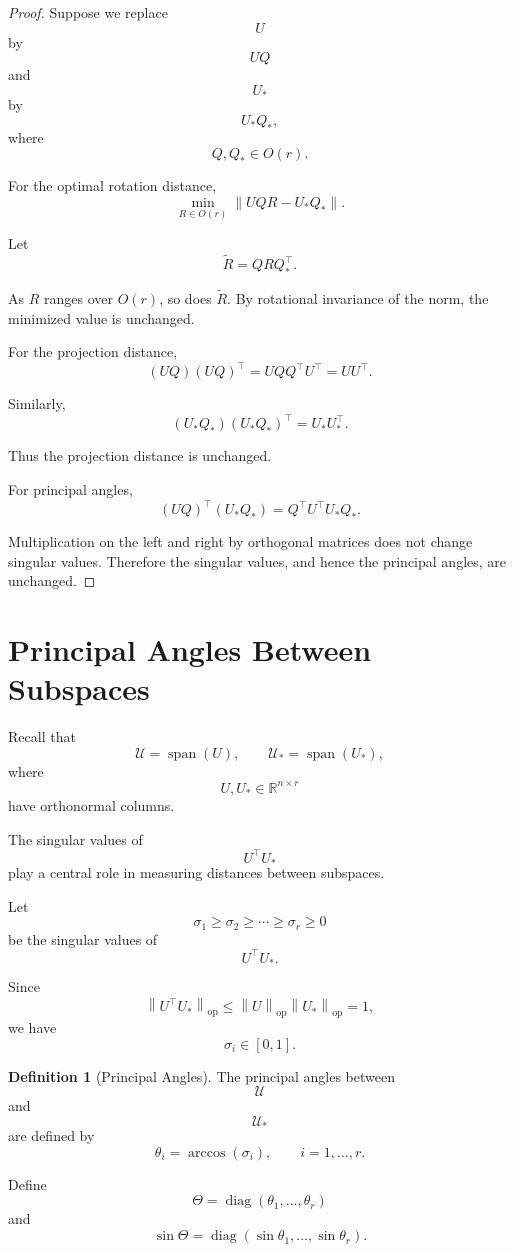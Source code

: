 \documentclass[12pt,oneside]{book}
\numberwithin{equation}{section}
\theoremstyle{definition}
\newtheorem{definition}{Definition}[section]
\theoremstyle{plain}
\theoremstyle{remark}
\newcommand{\R}{\mathbb{R}}
\newcommand{\norm}[1]{\left\lVert #1 \right\rVert}
\newcommand{\diag}{\operatorname{diag}}
\begin{document}
\begin{proof}
Suppose we replace
\[
U
\]
by
\[
UQ
\]
and
\[
U_*
\]
by
\[
U_*Q_*,
\]
where
\[
Q,Q_*\in O(r).
\]

For the optimal rotation distance,
\[
\min_{R\in O(r)}
\norm{UQR-U_*Q_*}.
\]

Let
\[
\widetilde{R}=QRQ_*^\top.
\]

As $R$ ranges over $O(r)$, so does $\widetilde{R}$. By rotational invariance of the norm, the minimized value is unchanged.

For the projection distance,
\[
(UQ)(UQ)^\top
=
UQQ^\top U^\top
=
UU^\top.
\]

Similarly,
\[
(U_*Q_*)(U_*Q_*)^\top
=
U_*U_*^\top.
\]

Thus the projection distance is unchanged.

For principal angles,
\[
(UQ)^\top(U_*Q_*)
=
Q^\top U^\top U_* Q_*.
\]

Multiplication on the left and right by orthogonal matrices does not change singular values. Therefore the singular values, and hence the principal angles, are unchanged.
\end{proof}

\section{Principal Angles Between Subspaces}

Recall that
\[
\mathcal{U}=\operatorname{span}(U),
\qquad
\mathcal{U}_*=\operatorname{span}(U_*),
\]
where
\[
U,U_*\in\R^{n\times r}
\]
have orthonormal columns.

The singular values of
\[
U^\top U_*
\]
play a central role in measuring distances between subspaces.

Let
\[
\sigma_1\geq \sigma_2\geq \cdots \geq \sigma_r\geq 0
\]
be the singular values of
\[
U^\top U_*.
\]

Since
\[
\norm{U^\top U_*}_{\mathrm{op}}
\leq
\norm{U}_{\mathrm{op}}
\norm{U_*}_{\mathrm{op}}
=
1,
\]
we have
\[
\sigma_i\in[0,1].
\]

\begin{definition}[Principal Angles]
The principal angles between
\[
\mathcal{U}
\]
and
\[
\mathcal{U}_*
\]
are defined by
\[
\theta_i
=
\arccos(\sigma_i),
\qquad
i=1,\dots,r.
\]
\end{definition}

Define
\[
\Theta
=
\diag(\theta_1,\dots,\theta_r)
\]
and
\[
\sin\Theta
=
\diag(\sin\theta_1,\dots,\sin\theta_r).
\]
\end{document}
